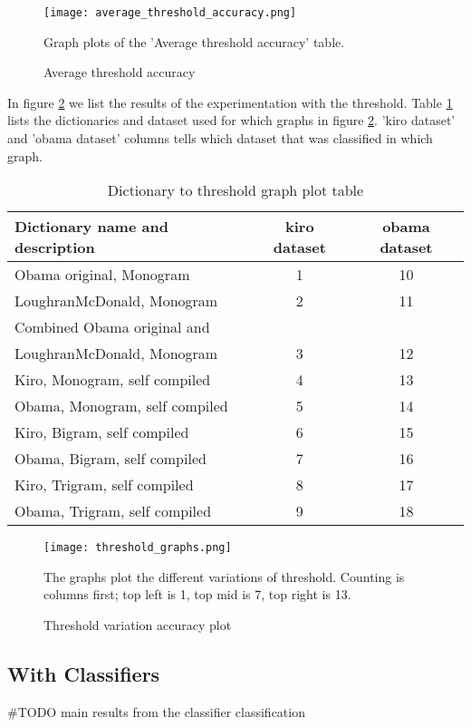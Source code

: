 \begin{figure}[htb]
    \centering
    \texttt{[image: average\_threshold\_accuracy.png]}
    \label{fig:average_threshold_accuracy}
    \caption{Average threshold accuracy}
Graph plots of the 'Average threshold accuracy' table.
\end{figure}

In figure \ref{fig:threshold_graphs} we list the results of the experimentation
with the threshold. Table \ref{tbl:dictionary_to_threshold} lists the
dictionaries and dataset used for which graphs in figure
\ref{fig:threshold_graphs}.
'kiro dataset' and 'obama dataset' columns tells which dataset that was
classified in which graph.

\begin{table}
\centering
\label{tbl:dictionary_to_threshold}
\caption{Dictionary to threshold graph plot table}
\begin{tabular}{ l c c }
Dictionary name and description & kiro dataset & obama dataset \\
\hline
Obama original, Monogram & 1 & 10 \\
LoughranMcDonald, Monogram & 2 & 11 \\
Combined Obama original and \\ LoughranMcDonald, Monogram & 3 & 12 \\
Kiro, Monogram, self compiled & 4 & 13 \\
Obama, Monogram, self compiled & 5 & 14 \\
Kiro, Bigram, self compiled & 6 & 15 \\
Obama, Bigram, self compiled & 7 & 16 \\
Kiro, Trigram, self compiled & 8 & 17 \\
Obama, Trigram, self compiled & 9 & 18 \\
\end{tabular}
\end{table}

\begin{figure}[htb]
    \centering
    \texttt{[image: threshold\_graphs.png]}
    \label{fig:threshold_graphs}
    \caption{Threshold variation accuracy plot}
The graphs plot the different variations of threshold. Counting is
columns first; top left is 1, top mid is 7, top right is 13.
\end{figure}

\subsection{With Classifiers}
#TODO main results from the classifier classification


